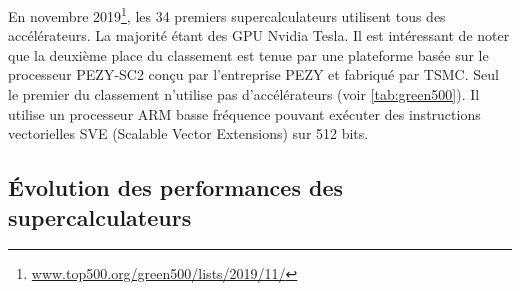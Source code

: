         En novembre 2019\footnote{\url{www.top500.org/green500/lists/2019/11/}}, les 34 premiers supercalculateurs utilisent tous des accélérateurs. La majorité étant des GPU Nvidia Tesla. Il est intéressant de noter que la deuxième place du classement est tenue par une plateforme basée sur le processeur PEZY-SC2 conçu par l'entreprise PEZY et fabriqué par TSMC. Seul le premier du classement n'utilise pas d'accélérateurs (voir \autoref{tab:green500}). Il utilise un processeur ARM basse fréquence pouvant exécuter des instructions vectorielles SVE (Scalable Vector Extensions) sur 512 bits.

        
        \begin{table}
            \centering
            \caption{Classement du Green500 de novembre 2019 selon l'efficacité énergétique (en gigaFLOPS/Watts). Les puissances Rpeak (puissance théorique) et Rmax (puissance mesurée par HPL) sont données en pétaFLOPS ($10^{15}$ FLOPS).}
            \label{tab:green500}
        \end{table}
        
        
\subsection{Évolution des performances des supercalculateurs}

